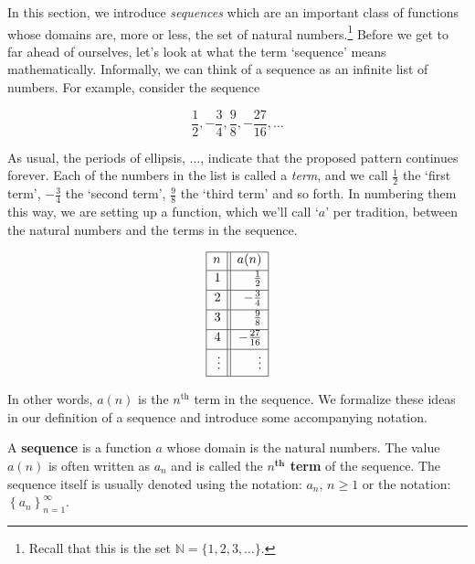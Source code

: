 

\setcounter{footnote}{0}

\label{Sequences}

In this section, we introduce \textit{sequences} which are an important class of functions whose domains are, more or less,  the set of natural numbers.\footnote{Recall that this is the set $\mathbb{N} = \{1, 2, 3, \ldots\}$.}  Before we get to far ahead of ourselves, let's look at what the term `sequence' means mathematically.  Informally, we can think of a sequence as an infinite list of numbers.  For example, consider the sequence

 \begin{equation} \label{seq1} \frac{1}{2}, -\frac{3}{4}, \frac{9}{8}, -\frac{27}{16}, \ldots \tag{1} \end{equation} 

As usual, the periods of  ellipsis, $\ldots$, indicate that the proposed pattern continues forever.  Each of the numbers in the list is called a  \textit{term}, and we call $\frac{1}{2}$ the `first term', $-\frac{3}{4}$  the `second term', $\frac{9}{8}$  the `third term' and so forth.  In numbering them this way, we are setting up a function, which we'll call `$a$' per tradition, between the natural numbers and the terms in the sequence.

\setlength{\extrarowheight}{2pt}

\[ \begin{array}{|r||r|}  \hline

n & a(n)  \\[2pt]  \hline
1  & \frac{1}{2} \\[3pt]  \hline 
2 & -\frac{3}{4}  \\[3pt] \hline 
3 & \frac{9}{8}  \\[3pt] \hline 
4 & -\frac{27}{16}  \\[3pt] \hline 
\vdots & \vdots  \\[2pt] \hline
\end{array} \] 

\setlength{\extrarowheight}{0pt}

In other words, $a(n)$ is the $n^{\text{th}}$ term in the sequence.  We formalize these ideas in our definition of a  sequence and introduce some accompanying notation.

\smallskip

\colorbox{ResultColor}{\bbm

\begin{defn} \label{sequencedefn}   A \textbf{sequence} is a function $a$ whose domain is the natural numbers. The value $a(n)$ is often written as $a_{n}$ and is called the   \textbf{\boldmath $n^{\textbf{th}}$ term} of the sequence.  The sequence itself is usually denoted using the notation:  $a_{n}$, $n \geq 1$ or the notation:  $\left\{ a_{n} \right\}_{n = 1}^{\infty}$.


\end{defn}

\ebm}

